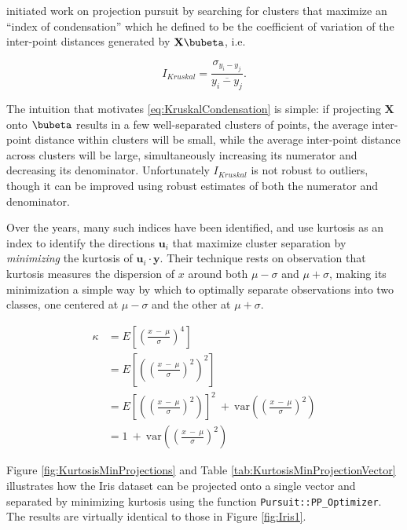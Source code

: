 \documentclass[graybox,envcountchap,sectrefs]{svmono}\usepackage[]{graphicx}\usepackage[]{xcolor}
\begin{document}
\begin{appendices}
\citet{Kruskal1969} initiated work on projection pursuit by searching
for clusters that maximize an ``index of condensation'' which he
defined to be the coefficient of variation of the inter-point distances
generated by $\mathbf{X}\bubeta$, i.e.

\begin{equation}
I_{Kruskal}=\frac{\sigma_{y_{i}-y_{j}}}{\overline{y_{i}-y_{j}}}.\label{eq:KruskalCondensation}
\end{equation}

The intuition that motivates \eqref{eq:KruskalCondensation} is simple:
if projecting $\mathbf{X}$ onto $\bubeta$ results in a few well-separated
clusters of points, the average inter-point distance within clusters
will be small, while the average inter-point distance across clusters
will be large, simultaneously increasing its numerator and decreasing
its denominator. Unfortunately $I_{Kruskal}$ is not robust to outliers,
though it can be improved using robust estimates of both the numerator
and denominator.

Over the years, many such indices have been identified, and \citet{HouWentzell2011}
use kurtosis as an index to identify the directions $\mathbf{u}_{i}$
that maximize cluster separation by \emph{minimizing} the kurtosis
of $\mathbf{u}_{i}\cdot\mathbf{y}$. Their technique rests on \citet{Moors1986}
observation that kurtosis measures the dispersion of $x$ around both
$\mu-\sigma$ and $\mu+\sigma$, making its minimization a simple
way by which to optimally separate observations into two classes,
one centered at $\mu-\sigma$ and the other at $\mu+\sigma$. 

\begin{align}
\kappa & =E\left[\left(\frac{x\ -\ \mu}{\sigma}\right)^{4}\right]\nonumber \\
 & =E\left[\left(\left(\frac{x\ -\ \mu}{\sigma}\right)^{2}\right)^{2}\right]\nonumber \\
 & =E\left[\left(\left(\frac{x\ -\ \mu}{\sigma}\right)^{2}\right)\right]^{2}\ +\ \mathrm{var}\left(\left(\frac{x\ -\ \mu}{\sigma}\right)^{2}\right)\nonumber \\
 & =1\ +\ \mathrm{var}\left(\left(\frac{x\ -\ \mu}{\sigma}\right)^{2}\right)\label{eq:KurtosisForICA}
\end{align}

Figure \ref{fig:KurtosisMinProjections} and Table \ref{tab:KurtosisMinProjectionVector}
illustrates how the Iris dataset can be projected onto a single vector
and separated by minimizing kurtosis using the function \texttt{Pursuit::PP\_Optimizer}.
The results are virtually identical to those in Figure \ref{fig:Iris1}. 


\end{appendices}
\end{document}
